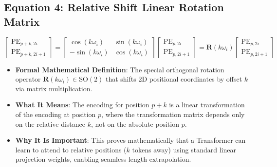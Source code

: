 \documentclass[11pt,a4paper]{article}
\theoremstyle{definition}
\begin{document}
\subsection{\textbf{Equation 4: Relative Shift Linear Rotation Matrix}}
{\boldmath
\begin{equation}
\begin{bmatrix} \operatorname{PE}_{p+k, 2i} \\ \operatorname{PE}_{p+k, 2i+1} \end{bmatrix} = \begin{bmatrix} \cos(k \omega_i) & \sin(k \omega_i) \\ -\sin(k \omega_i) & \cos(k \omega_i) \end{bmatrix} \begin{bmatrix} \operatorname{PE}_{p, 2i} \\ \operatorname{PE}_{p, 2i+1} \end{bmatrix} = \mathbf{R}(k \omega_i) \begin{bmatrix} \operatorname{PE}_{p, 2i} \\ \operatorname{PE}_{p, 2i+1} \end{bmatrix}
\end{equation}
}
\begin{itemize}
    \item \textbf{Formal Mathematical Definition}:
    The special orthogonal rotation operator $\mathbf{R}(k \omega_i) \in \mathrm{SO}(2)$ that shifts 2D positional coordinates by offset $k$ via matrix multiplication.
    \item \textbf{What It Means}:
    The encoding for position $p+k$ is a linear transformation of the encoding at position $p$, where the transformation matrix depends only on the relative distance $k$, not on the absolute position $p$.
    \item \textbf{Why It Is Important}:
    This proves mathematically that a Transformer can learn to attend to relative positions ($k$ tokens away) using standard linear projection weights, enabling seamless length extrapolation.
\end{itemize}
\end{document}
